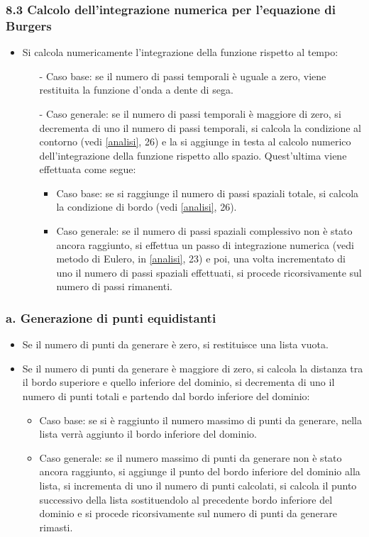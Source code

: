\subsubsection*{8.3 Calcolo dell'integrazione numerica per l'equazione di Burgers}
\begin{itemize}
\item Si calcola numericamente l'integrazione della funzione rispetto al tempo:
\begin{itemize}
\item[-] Caso base: se il numero di passi temporali è uguale a zero, viene restituita la funzione d'onda a dente di sega.
\item[-] Caso generale: se il numero di passi temporali è maggiore di zero, si decrementa di uno il numero di passi temporali, si calcola la condizione al contorno (vedi \ref{analisi}, 26) e la si aggiunge in testa al calcolo numerico dell'integrazione della funzione rispetto allo spazio. Quest'ultima viene effettuata come segue:
\begin{itemize}
\item Caso base: se si raggiunge il numero di passi spaziali totale, si calcola la condizione di bordo (vedi \ref{analisi}, 26).
\item Caso generale: se il numero di passi spaziali complessivo non è stato ancora raggiunto, si effettua un passo di integrazione numerica (vedi metodo di Eulero, in \ref{analisi}, 23) e poi, una volta incrementato di uno il numero di passi spaziali effettuati, si procede ricorsivamente sul numero di passi rimanenti. 
\end{itemize}
\end{itemize}
\end{itemize}


\subsubsection*{a. Generazione di punti equidistanti}
\begin{itemize}
\item Se il numero di punti da generare è zero, si restituisce una lista vuota.
\item Se il numero di punti da generare è maggiore di zero, si calcola la distanza tra il bordo superiore e quello inferiore del dominio, si decrementa di uno il numero di punti totali e partendo dal bordo inferiore del dominio:
\begin{itemize}
\item Caso base: se si è raggiunto il numero massimo di punti da generare, nella lista verrà aggiunto il bordo inferiore del dominio.
\item Caso generale: se il numero massimo di punti da generare non è stato ancora raggiunto, si aggiunge il punto del bordo inferiore del dominio alla lista, si incrementa di uno il numero di punti calcolati, si calcola il punto successivo della lista sostituendolo al precedente bordo inferiore del dominio e si procede ricorsivamente sul numero di punti da generare rimasti.
\end{itemize}
\end{itemize}


